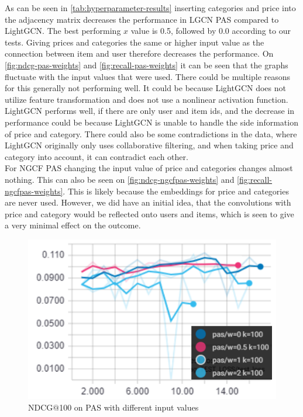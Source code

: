 As can be seen in \autoref{tab:hyperparameter-results} inserting categories and price into the adjacency matrix decreases the performance in LGCN PAS compared to LightGCN.
The best performing $x$ value is 0.5, followed by 0.0 according to our tests.
Giving prices and categories the same or higher input value as the connection between item and user therefore decreases the performance.
On \autoref{fig:ndcg-pas-weights} and \autoref{fig:recall-pas-weights} it can be seen that the graphs fluctuate with the input values that were used.
There could be multiple reasons for this generally not performing well.
It could be because LightGCN does not utilize feature transformation and does not use a nonlinear activation function.
LightGCN performs well, if there are only user and item ids, and the decrease in performance could be because LightGCN is unable to handle the side information of price and category.
There could also be some contradictions in the data, where LightGCN originally only uses collaborative filtering, and when taking price and category into account, it can contradict each other.\\
For NGCF PAS changing the input value of price and categories changes almost nothing.
This can also be seen on \autoref{fig:ndcg-ngcfpas-weights} and \autoref{fig:recall-ngcfpas-weights}.
This is likely because the embeddings for price and categories are never used.
However, we did have an initial idea, that the convolutions with price and category would be reflected onto users and items, which is seen to give a very minimal effect on the outcome.

\begin{figure}
    \includegraphics[width=\linewidth]{figures/graphs/ndcg-pas-weights.png}
    \caption{NDCG$@$100 on PAS with different input values}
    \label{fig:ndcg-pas-weights}
\end{figure}

